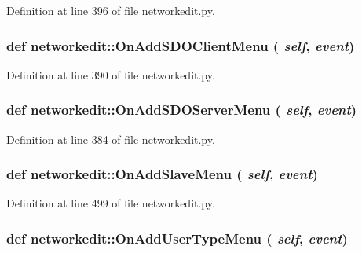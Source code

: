 Definition at line 396 of file networkedit.py.\hypertarget{namespacenetworkedit_3ddbeac7f2aa5d9eb954e410c5f9eb0a}{
\subsubsection[OnAddSDOClientMenu]{\setlength{\rightskip}{0pt plus 5cm}def networkedit::On\-Add\-SDOClient\-Menu ( {\em self},  {\em event})}}
\label{namespacenetworkedit_3ddbeac7f2aa5d9eb954e410c5f9eb0a}




Definition at line 390 of file networkedit.py.\hypertarget{namespacenetworkedit_b8badc56d1e65b90cadda0933b7231a1}{
\subsubsection[OnAddSDOServerMenu]{\setlength{\rightskip}{0pt plus 5cm}def networkedit::On\-Add\-SDOServer\-Menu ( {\em self},  {\em event})}}
\label{namespacenetworkedit_b8badc56d1e65b90cadda0933b7231a1}




Definition at line 384 of file networkedit.py.\hypertarget{namespacenetworkedit_4ff91dd5ec49b8435fc4871ad91cc150}{
\subsubsection[OnAddSlaveMenu]{\setlength{\rightskip}{0pt plus 5cm}def networkedit::On\-Add\-Slave\-Menu ( {\em self},  {\em event})}}
\label{namespacenetworkedit_4ff91dd5ec49b8435fc4871ad91cc150}




Definition at line 499 of file networkedit.py.\hypertarget{namespacenetworkedit_d6aa6d1dd5c2e4c1d7b9080e4c6744b0}{
\subsubsection[OnAddUserTypeMenu]{\setlength{\rightskip}{0pt plus 5cm}def networkedit::On\-Add\-User\-Type\-Menu ( {\em self},  {\em event})}}
\label{namespacenetworkedit_d6aa6d1dd5c2e4c1d7b9080e4c6744b0}




